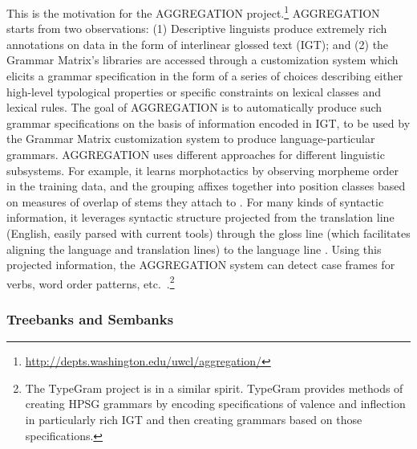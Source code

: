 \documentclass[output=paper,nonflat]{langsci/langscibook}
\begin{document}
This is the motivation for the AGGREGATION
project.\footnote{\url{http://depts.washington.edu/uwcl/aggregation/}}
AGGREGATION starts from two observations: (1) Descriptive linguists
produce extremely rich annotations on data in the form of interlinear
glossed text (IGT); and (2) the Grammar Matrix's libraries are
accessed through a customization system which elicits a grammar
specification in the form of a series of choices describing either
high-level typological properties or specific constraints on lexical
classes and lexical rules.  The goal of AGGREGATION is to
automatically produce such grammar specifications on the basis of
information encoded in IGT, to be used by the Grammar Matrix
customization system to produce language-particular
grammars. AGGREGATION uses different approaches for different
linguistic subsystems. For example, it learns morphotactics by
observing morpheme order in the training data, and the grouping
affixes together into position classes based on measures of overlap of
stems they attach to \citep{Wax:14,Zamaraeva:17}. For many kinds of
syntactic information, it leverages syntactic structure projected from
the translation line (English, easily parsed with current tools)
through the gloss line (which facilitates aligning the language and
translation lines) to the language line
\citep{Xia:Lew:07,Georgi:16}. Using this projected information, the
AGGREGATION system can detect case frames for verbs, word order
patterns, etc.\ \citep{Ben:Goo:Cro:Xia:13,Zam:How:Ben:19}.\footnote{The TypeGram project \citep{Hel:Bee:14} is in a similar spirit. TypeGram provides methods of creating HPSG grammars by encoding specifications of valence and inflection in particularly rich IGT and then creating grammars based on those specifications.}

\subsubsection{Treebanks and Sembanks}
\label{cl:lang-doc:treebanks}
\end{document}
